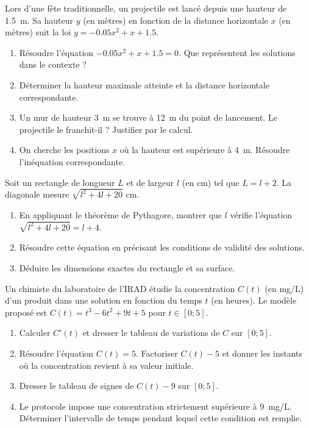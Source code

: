 \documentclass[11pt]{article}
\begin{document}
\begin{exercice}
Lors d'une fête traditionnelle, un projectile est lancé depuis une hauteur de \SI{1.5}{m}. Sa hauteur $y$ (en mètres) en fonction de la distance horizontale $x$ (en mètres) suit la loi $y=-0.05x^2+x+1.5$.
\begin{enumerate}
    \item Résoudre l'équation $-0.05x^2+x+1.5=0$. Que représentent les solutions dans le contexte ?
    \item Déterminer la hauteur maximale atteinte et la distance horizontale correspondante.
    \item Un mur de hauteur \SI{3}{m} se trouve à \SI{12}{m} du point de lancement. Le projectile le franchit-il ? Justifier par le calcul.
    \item On cherche les positions $x$ où la hauteur est supérieure à \SI{4}{m}. Résoudre l'inéquation correspondante.
\end{enumerate}
\end{exercice}

\begin{exercice}
Soit un rectangle de longueur $L$ et de largeur $l$ (en cm) tel que $L=l+2$. La diagonale mesure $\sqrt{l^2+4l+20}$ cm.
\begin{enumerate}
    \item En appliquant le théorème de Pythagore, montrer que $l$ vérifie l'équation $\sqrt{l^2+4l+20}=l+4$.
    \item Résoudre cette équation en précisant les conditions de validité des solutions.
    \item Déduire les dimensions exactes du rectangle et sa surface.
\end{enumerate}
\end{exercice}

\begin{exercice}
Un chimiste du laboratoire de l'IRAD étudie la concentration $C(t)$ (en mg/L) d'un produit dans une solution en fonction du temps $t$ (en heures). Le modèle proposé est $C(t)=t^3-6t^2+9t+5$ pour $t\in[0; 5]$.
\begin{enumerate}
    \item Calculer $C'(t)$ et dresser le tableau de variations de $C$ sur $[0; 5]$.
    \item Résoudre l'équation $C(t)=5$. Factoriser $C(t)-5$ et donner les instants où la concentration revient à sa valeur initiale.
    \item Dresser le tableau de signes de $C(t)-9$ sur $[0; 5]$.
    \item Le protocole impose une concentration strictement supérieure à \SI{9}{mg/L}. Déterminer l'intervalle de temps pendant lequel cette condition est remplie.
\end{enumerate}
\end{exercice}
\end{document}
